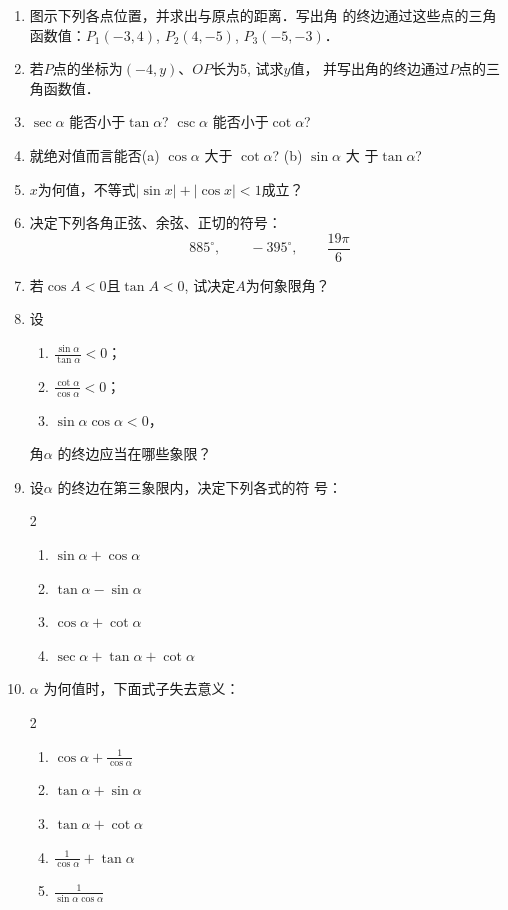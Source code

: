 \begin{ex}
\begin{enumerate}
    \item 图示下列各点位置，并求出与原点的距离．写出角
的终边通过这些点的三角函数值：$P_1(-3,4)$, $P_2(4,-5)$,
$P_3(-5,-3)$．
\item 若$P$点的坐标为$(-4,y)$、$OP$长为5, 试求$y$值，
并写出角的终边通过$P$点的三角函数值．
\item $\sec\alpha$ 能否小于$\tan \alpha$? $\csc\alpha$ 能否小于$\cot\alpha$?
\item 就绝对值而言能否(a) $\cos\alpha$  大于 
$\cot\alpha$? (b) $\sin\alpha$ 大
于$\tan\alpha$?
\item $x$为何值，不等式$|\sin x|+|\cos x|<1$成立？
\item 决定下列各角正弦、余弦、正切的符号：
\[885^{\circ},\qquad -395^{\circ},\qquad \frac{19\pi}{6}\]
\item 若$\cos A<0$且$\tan A<0$, 试决定$A$为何象限角？
\item 设
\begin{enumerate}
    \item $\frac{\sin\alpha}{\tan\alpha}<0$；
    \item $\frac{\cot\alpha}{\cos\alpha}<0$；
    \item $\sin\alpha \cos\alpha <0$，
\end{enumerate}
角$\alpha$ 的终边应当在哪些象限？
\item 设$\alpha$ 的终边在第三象限内，决定下列各式的符
号：
\begin{multicols}{2}
\begin{enumerate}
    \item $\sin\alpha  +\cos\alpha$
    \item $\tan \alpha-\sin\alpha$
    \item $\cos\alpha +\cot \alpha$
    \item $\sec\alpha  +\tan \alpha  +\cot \alpha$
\end{enumerate}    
\end{multicols}

\item $\alpha$ 为何值时，下面式子失去意义：
\begin{multicols}{2}
\begin{enumerate}
    \item $\cos\alpha  +\frac{1}{\cos\alpha}$
    \item $\tan \alpha+\sin\alpha$
    \item  $\tan \alpha+\cot\alpha$
    \item $\frac{1}{\cos\alpha} +\tan \alpha$
    \item $\frac{1}{\sin\alpha\cos\alpha}$
\end{enumerate}    
\end{multicols}
\end{enumerate}
\end{ex}

